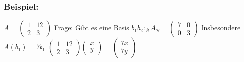 \subsubsection{Beispiel:}
$A=\begin{pmatrix} 1 & 12 \\ 2 & 3 \end{pmatrix}$ Frage: Gibt es eine Basis $b_{1}b_{2}: _{\mathcal{B}}A_{\mathcal{B}} = \begin{pmatrix} 7 & 0 \\ 0 & 3 \end{pmatrix}$ Insbesondere $A(b_{1})=7b_{1}$  $\begin{pmatrix}1 & 12 \\ 2 & 3 \end{pmatrix} \begin{pmatrix} x \\ y \end{pmatrix} = \begin{pmatrix} 7x \\ 7y \end{pmatrix}$ \\
